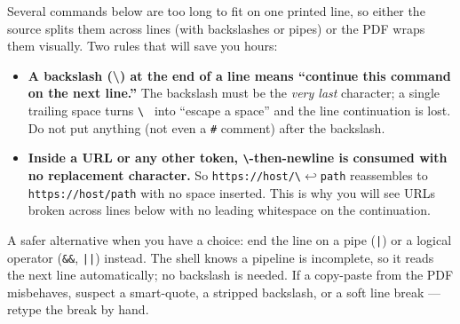 
\begin{warnbox}
Several commands below are too long to fit on one printed line, so either the source splits them across lines (with backslashes or pipes) or the PDF wraps them visually. Two rules that will save you hours:
\begin{itemize}[nosep]
  \item \textbf{A backslash (\textbackslash) at the end of a line means ``continue this command on the next line.''} The backslash must be the \textit{very last} character; a single trailing space turns \texttt{\textbackslash~} into ``escape a space'' and the line continuation is lost. Do not put anything (not even a \texttt{\#} comment) after the backslash.
  \item \textbf{Inside a URL or any other token, \texttt{\textbackslash}-then-newline is consumed with no replacement character.} So \texttt{https://host/\textbackslash}$\hookleftarrow$\texttt{path} reassembles to \texttt{https://host/path} with no space inserted. This is why you will see URLs broken across lines below with no leading whitespace on the continuation.
\end{itemize}
A safer alternative when you have a choice: end the line on a pipe (\texttt{|}) or a logical operator (\texttt{\&\&}, \texttt{||}) instead. The shell knows a pipeline is incomplete, so it reads the next line automatically; no backslash is needed. If a copy-paste from the PDF misbehaves, suspect a smart-quote, a stripped backslash, or a soft line break --- retype the break by hand.
\end{warnbox}


